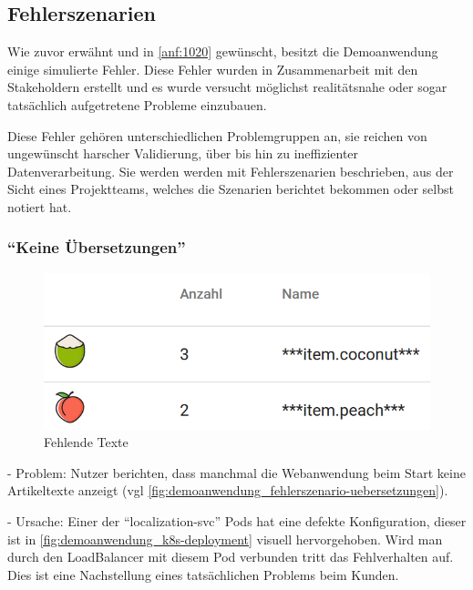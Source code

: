 \subsection{Fehlerszenarien}
\label{subsec:fehlerszenarien}

Wie zuvor erwähnt und in \autoref{anf:1020} gewünscht, besitzt die Demoanwendung einige simulierte Fehler. Diese Fehler wurden in Zusammenarbeit mit den Stakeholdern erstellt und es wurde versucht möglichst realitätsnahe oder sogar tatsächlich aufgetretene Probleme einzubauen.

Diese Fehler gehören unterschiedlichen Problemgruppen an, sie reichen von ungewünscht harscher Validierung, über  bis hin zu ineffizienter Datenverarbeitung. Sie werden werden mit Fehlerszenarien beschrieben, aus der Sicht eines Projektteams, welches die Szenarien berichtet bekommen oder selbst notiert hat.

\subsubsection{\enquote{Keine Übersetzungen}}

\begin{figure}
\centering
\vspace{-\baselineskip}
\includegraphics[width=\linewidth]{img/04_erstellung-poc/demoanwendung_fehlerszenario-uebersetzungen}
\caption{Fehlende Texte}
\label{fig:demoanwendung_fehlerszenario-uebersetzungen}
\end{figure}

- Problem: Nutzer berichten, dass manchmal die Webanwendung beim Start keine Artikeltexte anzeigt (vgl \autoref{fig:demoanwendung_fehlerszenario-uebersetzungen}).

- Ursache: Einer der \enquote{localization-svc} Pods hat eine defekte Konfiguration, dieser ist in \autoref{fig:demoanwendung_k8s-deployment} visuell hervorgehoben. Wird man durch den LoadBalancer mit diesem Pod verbunden tritt das Fehlverhalten auf. Dies ist eine Nachstellung eines tatsächlichen Problems beim Kunden.

